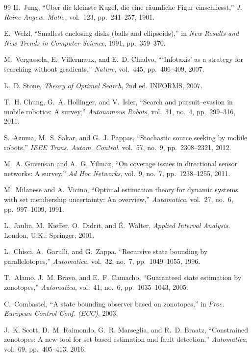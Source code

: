 \documentclass[preprint,12pt,3p]{elsarticle}
\theoremstyle{definition}
\begin{document}
\begin{thebibliography}{99}
H.~Jung, ``\"Uber die kleinste Kugel, die eine r\"aumliche Figur einschliesst,''
\emph{J. Reine Angew. Math.}, vol.~123, pp.~241--257, 1901.

E.~Welzl, ``Smallest enclosing disks (balls and ellipsoids),'' in \emph{New Results and New
Trends in Computer Science}, 1991, pp.~359--370.

M.~Vergassola, E.~Villermaux, and E.~D. Chialvo, ```Infotaxis' as a strategy for searching
without gradients,'' \emph{Nature}, vol.~445, pp.~406--409, 2007.

L.~D. Stone, \emph{Theory of Optimal Search}, 2nd ed. INFORMS, 2007.

T.~H. Chung, G.~A. Hollinger, and V.~Isler, ``Search and pursuit--evasion in mobile robotics: A
survey,'' \emph{Autonomous Robots}, vol.~31, no.~4, pp.~299--316, 2011.

S.~Azuma, M.~S. Sakar, and G.~J. Pappas, ``Stochastic source seeking by mobile robots,''
\emph{IEEE Trans. Autom. Control}, vol.~57, no.~9, pp.~2308--2321, 2012.

M.~A. Guvensan and A.~G. Yilmaz, ``On coverage issues in directional sensor networks: A survey,''
\emph{Ad Hoc Networks}, vol.~9, no.~7, pp.~1238--1255, 2011.

M.~Milanese and A.~Vicino, ``Optimal estimation theory for dynamic systems with set membership
uncertainty: An overview,'' \emph{Automatica}, vol.~27, no.~6, pp.~997--1009, 1991.

L.~Jaulin, M.~Kieffer, O.~Didrit, and \'E.~Walter, \emph{Applied Interval Analysis}.
London, U.K.: Springer, 2001.

L.~Chisci, A.~Garulli, and G.~Zappa, ``Recursive state bounding by parallelotopes,''
\emph{Automatica}, vol.~32, no.~7, pp.~1049--1055, 1996.

T.~Alamo, J.~M. Bravo, and E.~F. Camacho, ``Guaranteed state estimation by zonotopes,''
\emph{Automatica}, vol.~41, no.~6, pp.~1035--1043, 2005.

C.~Combastel, ``A state bounding observer based on zonotopes,'' in \emph{Proc. European Control
Conf. (ECC)}, 2003.

J.~K. Scott, D.~M. Raimondo, G.~R. Marseglia, and R.~D. Braatz, ``Constrained zonotopes: A new
tool for set-based estimation and fault detection,'' \emph{Automatica}, vol.~69, pp.~405--413,
2016.


\end{thebibliography}
\end{document}

